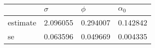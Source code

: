 \begin{tabular}{llll}
\toprule
{} &  $\sigma$ &    $\phi$ & $\alpha_0$ \\
\midrule
estimate &  2.096055 &  0.294007 &   0.142842 \\
se       &  0.063596 &  0.049669 &   0.004335 \\
\bottomrule
\end{tabular}
